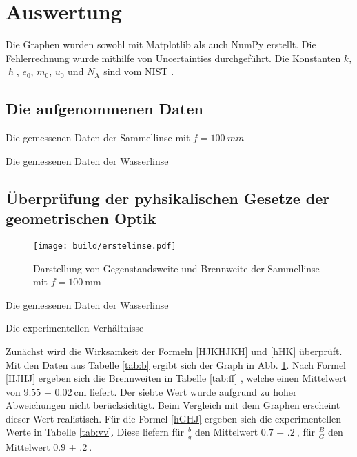 \section{Auswertung}
\label{sec:Auswertung}


Die Graphen wurden sowohl mit Matplotlib \cite{matplotlib} als auch NumPy \cite{numpy} erstellt. Die
Fehlerrechnung wurde mithilfe von Uncertainties \cite{uncertainties} durchgeführt.
Die Konstanten $k$, $\hslash$, $e_0$, $m_0$, $u_0$ und $N_\text{A}$ sind vom NIST \cite{nistgov}.
\subsection{Die aufgenommenen Daten}
\begin{table}
	\centering
	\caption{Die gemessenen Daten der Sammellinse mit $f = \SI{100}{mm}$}
	
	\label{tab:b}
\end{table}

\begin{table}
	\centering
	\caption{Die gemessenen Daten der Wasserlinse}
	
	\label{tab:w}
\end{table}


\subsection{Überprüfung der pyhsikalischen Gesetze der geometrischen Optik}

\begin{figure}
 \centering
 \texttt{[image: build/erstelinse.pdf]}
 \caption{Darstellung von Gegenstandsweite und Brennweite der Sammellinse mit $f = \SI{100}{\milli\meter}$}
 \label{fig:erste}
\end{figure}


\begin{table}
	\centering
	\caption{Die gemessenen Daten der Wasserlinse}
	
	\label{tab:ff}
\end{table}

\begin{table}
	\centering
	\caption{Die experimentellen Verhältnisse}
	
	\label{tab:vv}
\end{table}

Zunächst wird die Wirksamkeit der Formeln \eqref{HJKHJKH} und \eqref{hHK} überprüft.
Mit den Daten aus Tabelle \ref{tab:b} ergibt sich der Graph in Abb. \ref{fig:erste}. Nach Formel \eqref{HJHJ} ergeben sich die Brennweiten in Tabelle \ref{tab:ff}
, welche einen Mittelwert von $\SI{9.55(2)}{\centi\meter}$ liefert. Der siebte Wert wurde aufgrund zu hoher Abweichungen nicht berücksichtigt. Beim Vergleich mit dem Graphen erscheint dieser Wert realistisch.
Für die Formel \eqref{hGHJ} ergeben sich die experimentellen Werte in Tabelle \ref{tab:vv}. Diese liefern für $\frac{b}{g}$ den Mittelwert
$\SI{0.7(2)}{}$, für $\frac{B}{G}$ den Mittelwert $\SI{0.9(2)}{}$.



